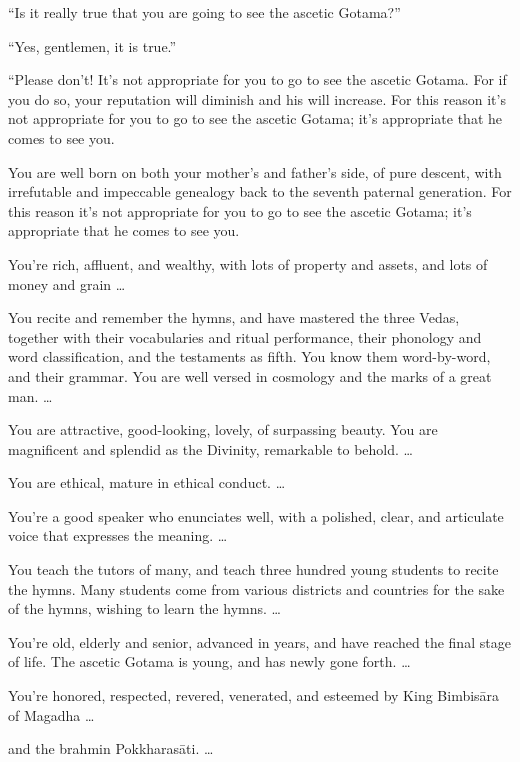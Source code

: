 \documentclass[12pt,openany]{book}%
\begin{document}
“Is it really true that you are going to see the ascetic Gotama?” 

“Yes, gentlemen, it is true.” 

“Please don’t! It’s not appropriate for you to go to see the ascetic Gotama. For if you do so, your reputation will diminish and his will increase. For this reason it’s not appropriate for you to go to see the ascetic Gotama; it’s appropriate that he comes to see you. 

You are well born on both your mother’s and father’s side, of pure descent, with irrefutable and impeccable genealogy back to the seventh paternal generation. For this reason it’s not appropriate for you to go to see the ascetic Gotama; it’s appropriate that he comes to see you. 

You’re rich, affluent, and wealthy, with lots of property and assets, and lots of money and grain … 

You recite and remember the hymns, and have mastered the three Vedas, together with their vocabularies and ritual performance, their phonology and word classification, and the testaments as fifth. You know them word-by-word, and their grammar. You are well versed in cosmology and the marks of a great man. … 

You are attractive, good-looking, lovely, of surpassing beauty. You are magnificent and splendid as the Divinity, remarkable to behold. … 

You are ethical, mature in ethical conduct. … 

You’re a good speaker who enunciates well, with a polished, clear, and articulate voice that expresses the meaning. … 

You teach the tutors of many, and teach three hundred young students to recite the hymns. Many students come from various districts and countries for the sake of the hymns, wishing to learn the hymns. … 

You’re old, elderly and senior, advanced in years, and have reached the final stage of life. The ascetic Gotama is young, and has newly gone forth. … 

You’re honored, respected, revered, venerated, and esteemed by King \textsanskrit{Bimbisāra} of Magadha … 

and the brahmin \textsanskrit{Pokkharasāti}. … 
\end{document}
